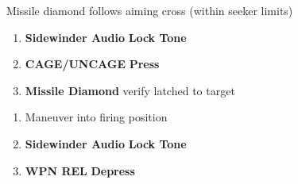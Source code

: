 \begin{checklistenumerate}
    Missile diamond follows aiming cross (within seeker limits)

    \begin{enumerate}[start=3]
        \item \textbf{Sidewinder Audio} \dotfill \textbf{Lock Tone}
        \item \textbf{CAGE/UNCAGE} \dotfill \textbf{Press}
        \item \textbf{Missile Diamond} \dotfill verify latched to target
    \end{enumerate}
    \begin{enumerate}
        \item Maneuver into firing position
        \item \textbf{Sidewinder Audio} \dotfill \textbf{Lock Tone}
        \item \textbf{WPN REL} \dotfill \textbf{Depress}
    \end{enumerate}
\end{checklistenumerate}

\clearpage


